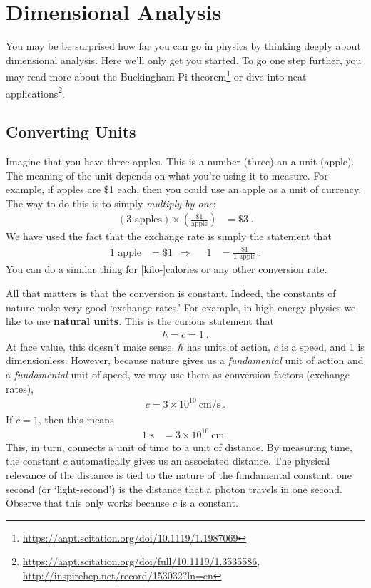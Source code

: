 
\section{Dimensional Analysis}

You may be be surprised how far you can go in physics by thinking deeply about dimensional analysis. Here we’ll only get you started. To go one step further, you may read more about the Buckingham Pi theorem\footnote{\url{https://aapt.scitation.org/doi/10.1119/1.1987069}} or dive into neat applications\footnote{\url{https://aapt.scitation.org/doi/full/10.1119/1.3535586}, \url{http://inspirehep.net/record/153032?ln=en}}.
%

\subsection{Converting Units}

Imagine that you have three apples. This is a number (three) an a unit (apple). The meaning of the unit depends on what you’re using it to measure. For example, if apples are \$1 each, then you could use an apple as a unit of currency. The way to do this is to simply \emph{multiply by one}:
\begin{align}
  (3\text{ apples}) \times \left(\frac{\text{\$ 1}}{\text{apple}}\right)
  &= \$ 3 \ .
\end{align}
We have used the fact that the exchange rate is simply the statement that
\begin{align}
  1\text{ apple} &= \$1
  & \Rightarrow &&
  1 &= \frac{\$ 1}{1\text{ apple}} \ .
\end{align}
You can do a similar thing for [kilo-]calories or any other conversion rate. 


All that matters is that the conversion is constant. Indeed, the constants of nature make very good `exchange rates.' For example, in high-energy physics we like to use \textbf{natural units}. This is the curious statement that
\begin{align}
  \hbar = c = 1 \ .
\end{align}
At face value, this doesn’t make sense. $\hbar$ has units of action, $c$ is a speed, and 1 is dimensionless. However, because nature gives us a \emph{fundamental} unit of action and a \emph{fundamental} unit of speed, we may use them as conversion factors (exchange rates),
\begin{align}
  c = 3 \times 10^{10}~\text{cm}/\text{s} \ .
\end{align}
If $c=1$, then this means
\begin{align}
  1 \text{ s} &=  3 \times 10^{10}~\text{cm} \ .
\end{align}
This, in turn, connects a unit of time to a unit of distance. By measuring time, the constant $c$ automatically gives us an associated distance. The physical relevance of the distance is tied to the nature of the fundamental constant: one second (or `light-second') is the distance that a photon travels in one second. Observe that this only works because $c$ is a constant. 

